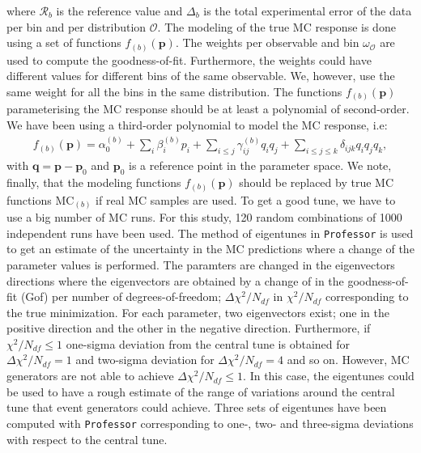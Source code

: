 \documentclass[aps,preprint,floatfix,nofootinbib,showpacs]{revtex4-1}
\begin{document}
where $\mathcal{R}_b$ is the reference value and $\Delta_b$ 
is the total experimental error of the data per bin and per 
distribution $\mathcal{O}$. The modeling of the true MC response 
is done using a set of functions $f_{(b)}(\textbf{p})$. The weights
per observable and bin $\omega_\mathcal{O}$ are used to compute the 
goodness-of-fit. Furthermore, the weights could have different values 
for different bins of the same observable. We, however, use the same 
weight for all the bins in the same distribution. 
The functions $f_{(b)}(\textbf{p})$
parameterising the MC response should be at least a polynomial of second-order.
We have been using a third-order polynomial to model the MC response, i.e:
\begin{eqnarray}
 f_{(b)}(\textbf{p}) = \alpha_0^{(b)} + \sum_i \beta_i^{(b)} p_i + \sum_{i \leq j} \gamma_{ij}^{(b)} q_i q_j +
 \sum_{i\leq j \leq k} \delta_{ijk} q_i q_j q_k,
 \label{MC-response}
\end{eqnarray}
with $\textbf{q} = \textbf{p} - \textbf{p}_0$ and $\textbf{p}_0$ is a reference point in the 
parameter space. We note, finally, that the modeling functions $f_{(b)}(\textbf{p})$ 
should be replaced by true MC functions $\text{MC}_{(b)}$ if real MC samples are used.
To get a good tune, we have to use a big number of MC runs. 
For this study, 120 random combinations
of 1000 independent runs have been used. 
The method of eigentunes in \texttt{Professor} is used to get an estimate of the 
uncertainty in the MC predictions where a change of the parameter values is 
performed. The paramters are changed in the eigenvectors directions where the 
eigenvectors are obtained by a change of in the goodness-of-fit (Gof) 
per number of degrees-of-freedom; 
$\Delta \chi^2/N_{df}$ in $\chi^2/N_{df}$ corresponding to the true minimization. 
For each parameter, two eigenvectors exist; one in the positive direction and the other 
in the negative direction. Furthermore, if $\chi^2/N_{df} \leq 1$ one-sigma deviation 
from the central tune is obtained for $\Delta \chi^2/N_{df} = 1$ and two-sigma deviation
for $\Delta \chi^2/N_{df} = 4$ and so on.
However, MC generators are not able to achieve $\Delta \chi^2/N_{df} \leq 1$. In this case,
the eigentunes could be used to have a rough estimate of the range of variations around
the central tune that event generators could achieve. Three sets of eigentunes have 
been computed with \texttt{Professor} corresponding to one-, two- and three-sigma deviations with 
respect to the central tune.

\end{document}
